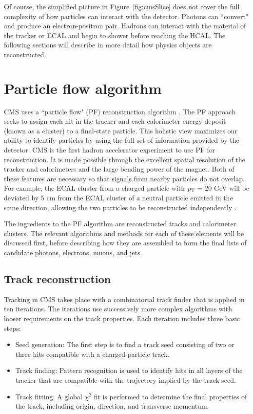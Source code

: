 Of course, the simplified picture in Figure~\ref{fig:cmsSlice} does not cover the full complexity of how particles can interact with the detector. Photons can ``convert" and produce an electron-positron pair. Hadrons can interact with the material of the tracker or ECAL and begin to shower before reaching the HCAL. The following sections will describe in more detail how physics objects are reconstructed. 


\section{Particle flow algorithm}
\label{sec:ParticleFlow}
CMS uses a ``particle flow" (PF) reconstruction algorithm \cite{ParticleFlow}. The PF approach seeks to assign each hit in the tracker and each calorimeter energy deposit (known as a cluster) to a final-state particle. This holistic view maximizes our ability to identify particles by using the full set of information provided by the detector. CMS is the first hadron accelerator experiment to use PF for reconstruction. It is made possible through the excellent spatial resolution of the tracker and calorimeters and the large bending power of the magnet. Both of these features are necessary so that signals from nearby particles do not overlap. For example, the ECAL cluster from a charged particle with $p_{\mathrm{T}} =$ 20 GeV will be deviated by 5 cm from the ECAL cluster of a neutral particle emitted in the same direction, allowing the two particles to be reconstructed independently \cite{ParticleFlow}.

The ingredients to the PF algorithm are reconstructed tracks and calorimeter clusters. The relevant algorithms and methods for each of these elements will be discussed first, before describing how they are assembled to form the final lists of candidate photons, electrons, muons, and jets. 

\subsection{Track reconstruction}
\label{sec:trackReco}
Tracking in CMS takes place with a combinatorial track finder that is applied in ten iterations. The iterations use successively more complex algorithms with looser requirements on the track properties. Each iteration includes three basic steps:
\begin{itemize}
\item Seed generation: The first step is to find a track seed consisting of two or three hits compatible with a charged-particle track.
\item Track finding: Pattern recognition is used to identify hits in all layers of the tracker that are compatible with the trajectory implied by the track seed. 
\item Track fitting: A global $\chi^2$ fit is performed to determine the final properties of the track, including origin, direction, and transverse momentum. 
\end{itemize}

